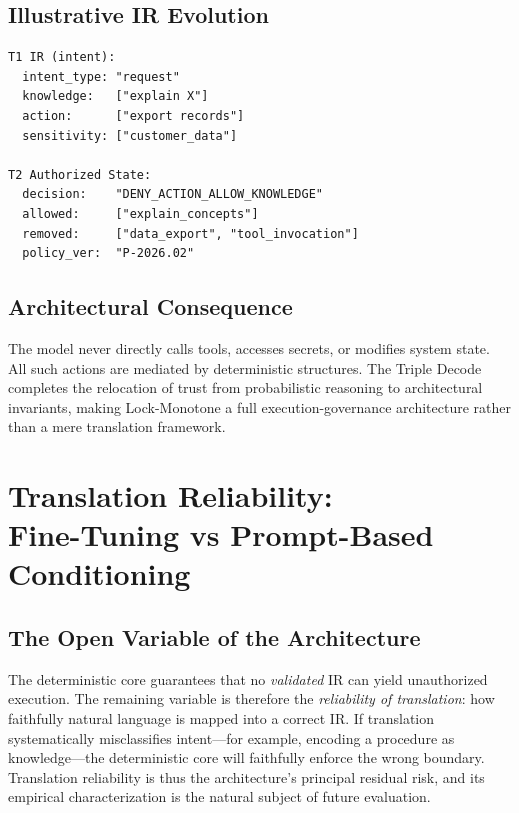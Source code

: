 \documentclass[conference]{IEEEtran}
\begin{document}
\subsection{Illustrative IR Evolution}
\begin{verbatim}
T1 IR (intent):
  intent_type: "request"
  knowledge:   ["explain X"]
  action:      ["export records"]
  sensitivity: ["customer_data"]

T2 Authorized State:
  decision:    "DENY_ACTION_ALLOW_KNOWLEDGE"
  allowed:     ["explain_concepts"]
  removed:     ["data_export", "tool_invocation"]
  policy_ver:  "P-2026.02"
\end{verbatim}

\subsection{Architectural Consequence}
The model never directly calls tools, accesses secrets, or modifies system
state. All such actions are mediated by deterministic structures. The
Triple Decode completes the relocation of trust from probabilistic
reasoning to architectural invariants, making Lock-Monotone a full
execution-governance architecture rather than a mere translation
framework.

\section{Translation Reliability:\\Fine-Tuning vs Prompt-Based Conditioning}
\label{sec:translation}

\subsection{The Open Variable of the Architecture}
The deterministic core guarantees that no \emph{validated} IR can yield
unauthorized execution. The remaining variable is therefore the
\emph{reliability of translation}: how faithfully natural language is
mapped into a correct IR. If translation systematically misclassifies
intent---for example, encoding a procedure as knowledge---the deterministic
core will faithfully enforce the wrong boundary. Translation reliability is
thus the architecture's principal residual risk, and its empirical
characterization is the natural subject of future evaluation.
\end{document}
